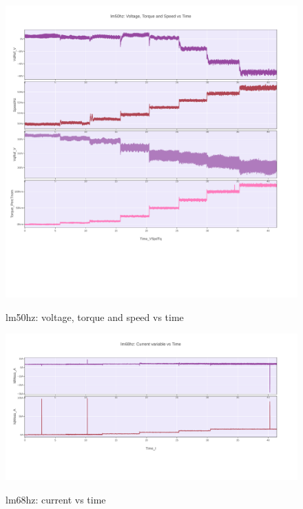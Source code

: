 \documentclass[paper=a4, fontsize=11pt]{scrartcl} %
\numberwithin{equation}{section} %
\numberwithin{figure}{section} %
\numberwithin{table}{section} %
\begin{document}
  \begin{figure}[H]
    \centering
      \href{https://plot.ly/~versag/40/#/}{\includegraphics[width=1\linewidth]{lm50hz_voltage_torque_speed_vs_time}}
        \caption{lm50hz: voltage, torque and speed vs time}
  \end{figure}

  \begin{figure}[H]
    \centering
      \href{https://plot.ly/~versag/42/#/}{\includegraphics[width=1\linewidth]{lm68hz_current_vs_time}}
        \caption{lm68hz: current vs time}
  \end{figure}
\end{document}
